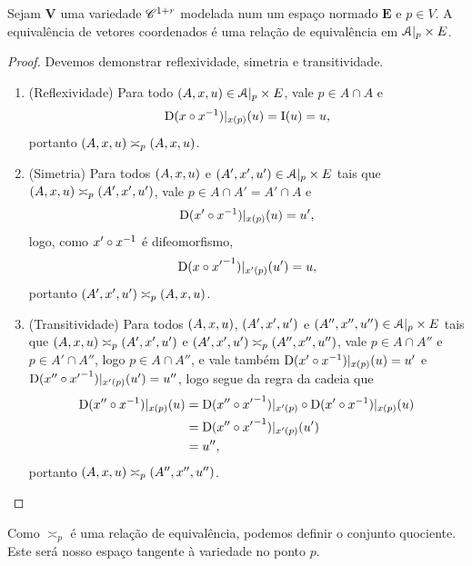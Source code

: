 \begin{proposition}
Sejam $\bm V$ uma variedade $\mathscr{C}^{1+r}$ modelada num um espaço normado $\bm E$ e $p \in V$. A equivalência de vetores coordenados é uma relação de equivalência em $\mathcal{A}|_p \times E$.
\end{proposition}
\begin{proof}
	Devemos demonstrar reflexividade, simetria e transitividade.
	\begin{enumerate}
	\item (Reflexividade) Para todo $(A,x,u) \in \mathcal{A}|_p \times E$, vale $p \in A \cap A$ e
		\begin{equation*}
			\mathrm{D} (x \circ x^{-1})|_{x(p)}(u) = \mathrm{I}(u) = u,
		\end{equation*}
	portanto  $(A,x,u) \asymp_p (A,x,u)$.
	
	\item (Simetria) Para todos $(A,x,u)$ e $(A',x',u') \in \mathcal{A}|_p \times E$ tais que $(A,x,u) \asymp_p (A',x',u')$, vale $p \in A \cap A' = A' \cap A$ e
		\begin{equation*}
			\mathrm{D} (x' \circ x^{-1})|_{x(p)}(u) = u',
		\end{equation*}
	logo, como $x' \circ x^{-1}$ é difeomorfismo,
		\begin{equation*}
			\mathrm{D} (x \circ {x'}^{-1})|_{x'(p)}(u') = u,
		\end{equation*}
	portanto $(A',x',u') \asymp_p (A,x,u)$.
	
	\item (Transitividade) Para todos $(A,x,u)$, $(A',x',u')$ e $(A'',x'',u'') \in \mathcal{A}|_p \times E$ tais que $(A,x,u) \asymp_p (A',x',u')$ e $(A',x',u') \asymp_p (A'',x'',u'')$, vale $p \in A \cap A''$ e $p \in A' \cap A''$, logo $p \in A \cap A''$, e vale também $\mathrm{D} (x' \circ x^{-1})|_{x(p)}(u) = u'$ e $\mathrm{D} (x'' \circ {x'}^{-1})|_{x'(p)}(u') = u''$, logo segue da regra da cadeia que
	\begin{align*}
		\mathrm{D} (x'' \circ x^{-1})|_{x(p)}(u) &= \mathrm{D} (x'' \circ {x'}^{-1})|_{x'(p)} \circ \mathrm{D} (x' \circ x^{-1})|_{x(p)}(u) \\
			&= \mathrm{D} (x'' \circ {x'}^{-1})|_{x'(p)}(u') \\
			&= u'',
	\end{align*}
	portanto $(A,x,u) \asymp_p (A'',x'',u'')$.
	\qedhere
	\end{enumerate}
\end{proof}

Como $\asymp_p$ é uma relação de equivalência, podemos definir o conjunto quociente. Este será nosso espaço tangente à variedade no ponto $p$.

